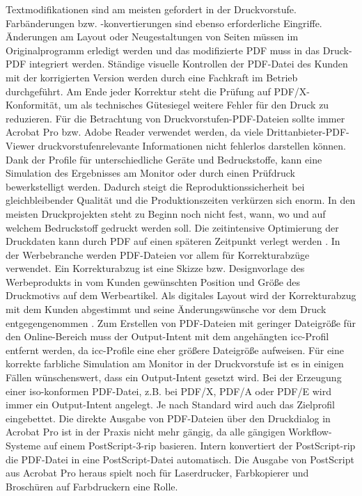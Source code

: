 Textmodifikationen sind am meisten gefordert in der Druckvorstufe. Farbänderungen bzw. -konvertierungen sind ebenso erforderliche Eingriffe. Änderungen am Layout oder Neugestaltungen von Seiten müssen im Originalprogramm erledigt werden und das modifizierte PDF muss in das Druck-PDF integriert werden. Ständige visuelle Kontrollen der PDF-Datei des Kunden mit der korrigierten Version werden durch eine Fachkraft im Betrieb durchgeführt. Am Ende jeder Korrektur steht die Prüfung auf PDF/X-Konformität, um als technisches Gütesiegel weitere Fehler für den Druck zu reduzieren. Für die Betrachtung von Druckvorstufen-PDF-Dateien sollte immer Acrobat Pro bzw. Adobe Reader verwendet werden, da viele Drittanbieter-PDF-Viewer druckvorstufenrelevante Informationen nicht fehlerlos darstellen können. Dank der Profile für unterschiedliche Geräte und Bedruckstoffe, kann eine Simulation des Ergebnisses am Monitor oder durch einen Prüfdruck bewerkstelligt werden. Dadurch steigt die Reproduktionssicherheit bei gleichbleibender Qualität und die Produktionszeiten verkürzen sich enorm. In den meisten Druckprojekten steht zu Beginn noch nicht fest, wann, wo und auf welchem Bedruckstoff gedruckt werden soll. Die zeitintensive Optimierung der Druckdaten kann durch PDF auf einen späteren Zeitpunkt verlegt werden \cite{schneeberger}. In der Werbebranche werden PDF-Dateien vor allem für Korrekturabzüge verwendet. Ein Korrekturabzug ist eine Skizze bzw. Designvorlage des Werbeprodukts in vom Kunden gewünschten Position und Größe des Druckmotivs auf dem Werbeartikel. Als digitales Layout wird der Korrekturabzug mit dem Kunden abgestimmt und seine Änderungswünsche vor dem Druck entgegengenommen \cite{korrektur}. Zum Erstellen von PDF-Dateien mit geringer Dateigröße für den Online-Bereich muss der Output-Intent mit dem angehängten \gls{icc}-Profil entfernt werden, da \gls{icc}-Profile eine eher größere Dateigröße aufweisen. Für eine korrekte farbliche Simulation am Monitor in der Druckvorstufe ist es in einigen Fällen wünschenswert, dass ein Output-Intent gesetzt wird. Bei der Erzeugung einer \gls{iso}-konformen PDF-Datei, z.B. bei PDF/X, PDF/A oder PDF/E wird immer ein Output-Intent angelegt. Je nach Standard wird auch das Zielprofil eingebettet. Die direkte Ausgabe von PDF-Dateien über den Druckdialog in Acrobat Pro ist in der Praxis nicht mehr gängig, da alle gängigen Workflow-Systeme auf einem PostScript-3-\gls{rip} basieren. Intern konvertiert der PostScript-\gls{rip} die PDF-Datei in eine PostScript-Datei automatisch. Die Ausgabe von PostScript aus Acrobat Pro heraus spielt noch für Laserdrucker, Farbkopierer und Broschüren auf Farbdruckern eine Rolle. \\
